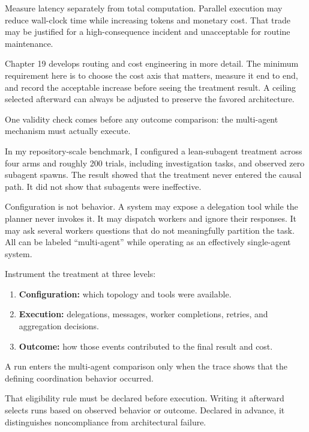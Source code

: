 Measure latency separately from total computation. Parallel execution may reduce wall-clock time while increasing tokens and monetary cost. That trade may be justified for a high-consequence incident and unacceptable for routine maintenance.

Chapter 19 develops routing and cost engineering in more detail. The minimum requirement here is to choose the cost axis that matters, measure it end to end, and record the acceptable increase before seeing the treatment result. A ceiling selected afterward can always be adjusted to preserve the favored architecture.

One validity check comes before any outcome comparison: the multi-agent mechanism must actually execute.

In my repository-scale benchmark, I configured a lean-subagent treatment across four arms and roughly 200 trials, including investigation tasks, and observed zero subagent spawns. The result showed that the treatment never entered the causal path. It did not show that subagents were ineffective.

Configuration is not behavior. A system may expose a delegation tool while the planner never invokes it. It may dispatch workers and ignore their responses. It may ask several workers questions that do not meaningfully partition the task. All can be labeled ``multi-agent'' while operating as an effectively single-agent system.


Instrument the treatment at three levels:

\begin{enumerate}
\def\labelenumi{\arabic{enumi}.}
\tightlist
\item
  \textbf{Configuration:} which topology and tools were available.
\item
  \textbf{Execution:} delegations, messages, worker completions, retries, and aggregation decisions.
\item
  \textbf{Outcome:} how those events contributed to the final result and cost.
\end{enumerate}

A run enters the multi-agent comparison only when the trace shows that the defining coordination behavior occurred.

That eligibility rule must be declared before execution. Writing it afterward selects runs based on observed behavior or outcome. Declared in advance, it distinguishes noncompliance from architectural failure.

